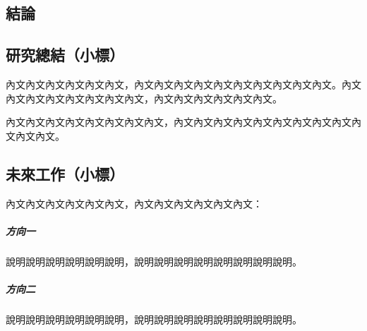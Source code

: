 \begin{ZhChapter}

\chapter{結論}

\section{研究總結（小標）}

內文內文內文內文內文內文，內文內文內文內文內文內文內文內文內文內文。內文內文內文內文內文內文內文內文，內文內文內文內文內文內文。

內文內文內文內文內文內文內文內文，內文內文內文內文內文內文內文內文內文內文內文內文。

\section{未來工作（小標）}

內文內文內文內文內文內文，內文內文內文內文內文內文：

\paragraph{方向一}
說明說明說明說明說明說明，說明說明說明說明說明說明說明說明。

\paragraph{方向二}
說明說明說明說明說明說明，說明說明說明說明說明說明說明說明。

\end{ZhChapter}